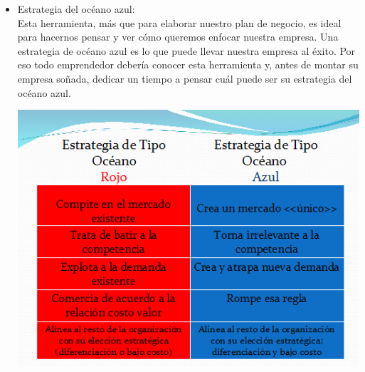 	\begin{itemize}
\item Estrategia del océano azul:
\\Esta herramienta, más que para elaborar nuestro plan de negocio, es ideal para hacernos pensar y ver cómo queremos enfocar nuestra empresa. Una estrategia de océano azul es lo que puede llevar nuestra empresa al éxito. Por eso todo emprendedor debería conocer esta herramienta y, antes de montar su empresa soñada, dedicar un tiempo a pensar cuál puede ser su estrategia del océano azul.
		\begin{center}
		\includegraphics[width=15cm]{./Imagenes/Imagen6}
		\end{center}
	\end{itemize} 
	
